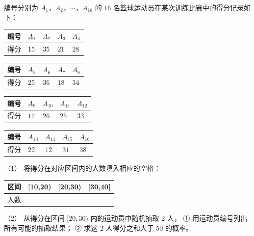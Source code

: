 \begin{question}
编号分别为 $A_1$，$A_2$，$\cdots$，$A_{16}$ 的 $16$ 名篮球运动员在某次训练比赛中的得分记录如下：

\begin{center}
\begin{tabular}{lllll}
\toprule
编号 & $A_1$ & $A_2$ & $A_3$ & $A_4$ \\
\midrule
得分 & $15$ & $35$ & $21$ & $28$ \\
\bottomrule
\end{tabular}
\end{center}

\begin{center}
\begin{tabular}{lllll}
\toprule
编号 & $A_5$ & $A_6$ & $A_7$ & $A_8$ \\
\midrule
得分 & $25$ & $36$ & $18$ & $34$ \\
\bottomrule
\end{tabular}
\end{center}

\begin{center}
\begin{tabular}{lllll}
\toprule
编号 & $A_9$ & $A_{10}$ & $A_{11}$ & $A_{12}$ \\
\midrule
得分 & $17$ & $26$ & $25$ & $33$ \\
\bottomrule
\end{tabular}
\end{center}

\begin{center}
\begin{tabular}{lllll}
\toprule
编号 & $A_{13}$ & $A_{14}$ & $A_{15}$ & $A_{16}$ \\
\midrule
得分 & $22$ & $12$ & $31$ & $38$ \\
\bottomrule
\end{tabular}
\end{center}

（1） 将得分在对应区间内的人数填入相应的空格：

\begin{center}
\begin{tabular}{llll}
\toprule
区间 & [10,20) & [20,30) & [30,40] \\
\midrule
人数 &  &  &  \\
\bottomrule
\end{tabular}
\end{center}

（2） 从得分在区间 $[20,30)$ 内的运动员中随机抽取 $2$ 人，
① 用运动员编号列出所有可能的抽取结果；
② 求这 $2$ 人得分之和大于 $50$ 的概率。

\end{question}
